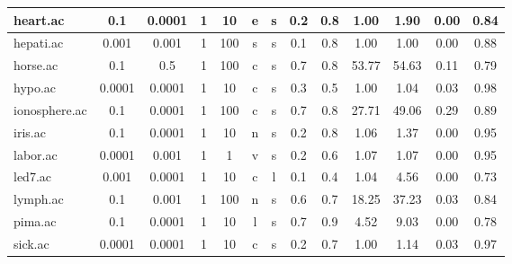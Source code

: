 \begin{table}[htbp]
{\begin{tabular}{|l|c|c|c|c|c|c|c|c||c|c|c|c|}
		\hline
		heart.ac       & 0.1      & 0.0001      & 1              & 10       & e                   & s        & 0.2    & 0.8   & 1.00           & 1.90           & 0.00           & 0.84           \\
		\hline
		hepati.ac      & 0.001    & 0.001       & 1              & 100      & s                   & s        & 0.1    & 0.8   & 1.00           & 1.00           & 0.00           & 0.88           \\
		\hline
		horse.ac       & 0.1      & 0.5         & 1              & 100      & c                   & s        & 0.7    & 0.8   & 53.77          & 54.63          & 0.11           & 0.79           \\
		\hline
		hypo.ac        & 0.0001   & 0.0001      & 1              & 10       & c                   & s        & 0.3    & 0.5   & 1.00           & 1.04           & 0.03           & 0.98           \\
		\hline
		ionosphere.ac  & 0.1      & 0.0001      & 1              & 100      & c                   & s        & 0.7    & 0.8   & 27.71          & 49.06          & 0.29           & 0.89           \\
		\hline
		iris.ac        & 0.1      & 0.0001      & 1              & 10       & n                   & s        & 0.2    & 0.8   & 1.06           & 1.37           & 0.00           & 0.95           \\
		\hline
		labor.ac       & 0.0001   & 0.001       & 1              & 1        & v                   & s        & 0.2    & 0.6   & 1.07           & 1.07           & 0.00           & 0.95           \\
		\hline
		led7.ac        & 0.001    & 0.0001      & 1              & 10       & c                   & l        & 0.1    & 0.4   & 1.04           & 4.56           & 0.00           & 0.73           \\
		\hline
		lymph.ac       & 0.1      & 0.001       & 1              & 100      & n                   & s        & 0.6    & 0.7   & 18.25          & 37.23          & 0.03           & 0.84           \\
		\hline
		pima.ac        & 0.1      & 0.0001      & 1              & 10       & l                   & s        & 0.7    & 0.9   & 4.52           & 9.03           & 0.00           & 0.78           \\
		\hline
		sick.ac        & 0.0001   & 0.0001      & 1              & 10       & c                   & s        & 0.2    & 0.7   & 1.00           & 1.14           & 0.03           & 0.97           \\

\end{tabular}}
\end{table}
